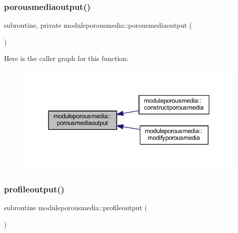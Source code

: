\subsubsection{\texorpdfstring{porousmediaoutput()}{porousmediaoutput()}}
{\footnotesize\ttfamily subroutine, private moduleporousmedia\+::porousmediaoutput (\begin{DoxyParamCaption}{ }\end{DoxyParamCaption})\hspace{0.3cm}{\ttfamily [private]}}

Here is the caller graph for this function\+:\nopagebreak
\begin{figure}[H]
\begin{center}
\leavevmode
\includegraphics[width=339pt]{namespacemoduleporousmedia_a2bde5212b61a523c797e44d2787e0e7d_icgraph}
\end{center}
\end{figure}
\mbox{\label{namespacemoduleporousmedia_a929b6fbd1b7c5c387333ef5f2d508c18}} 
\subsubsection{\texorpdfstring{profileoutput()}{profileoutput()}}
{\footnotesize\ttfamily subroutine moduleporousmedia\+::profileoutput (\begin{DoxyParamCaption}{ }\end{DoxyParamCaption})\hspace{0.3cm}{\ttfamily [private]}}

